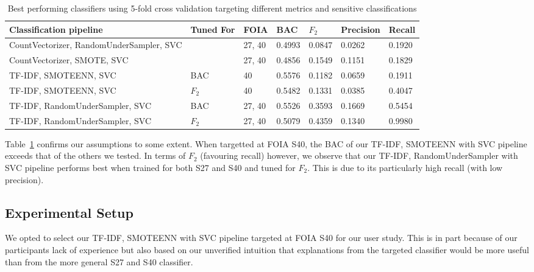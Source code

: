 \documentclass[\version]{l4proj}
\begin{document}
\begin{table}[H]
    \begin{adjustbox}{width=\textwidth,center}
        \begin{tabular}{l|llllll}
            Classification pipeline                  & Tuned For & FOIA   & BAC    & \(F_{2}\) & Precision & Recall \\ \hline
            CountVectorizer, RandomUnderSampler, SVC &           & 27, 40 & 0.4993 & 0.0847    & 0.0262    & 0.1920 \\
            CountVectorizer, SMOTE, SVC              &           & 27, 40 & 0.4856 & 0.1549    & 0.1151    & 0.1829 \\
            TF-IDF, SMOTEENN, SVC                    & BAC       & 40     & 0.5576 & 0.1182    & 0.0659    & 0.1911 \\
            TF-IDF, SMOTEENN, SVC                    & \(F_{2}\) & 40     & 0.5482 & 0.1331    & 0.0385    & 0.4047 \\
            TF-IDF, RandomUnderSampler, SVC          & BAC       & 27, 40 & 0.5526 & 0.3593    & 0.1669    & 0.5454 \\
            TF-IDF, RandomUnderSampler, SVC          & \(F_{2}\) & 27, 40 & 0.5079 & 0.4359    & 0.1340    & 0.9980 \\
        \end{tabular}
    \end{adjustbox}
    \caption{Best performing classifiers using 5-fold cross validation targeting different metrics and sensitive classifications}\label{tab:clf_perf}
\end{table}

Table~\ref{tab:clf_perf} confirms our assumptions to some extent.
When targetted at FOIA S40, the BAC of our TF-IDF, SMOTEENN with SVC pipeline exceeds that of the others we tested.
In terms of \(F_{2}\) (favouring recall) however, we observe that our TF-IDF, RandomUnderSampler with SVC pipeline performs best when trained for both S27 and S40 and tuned for \(F_{2}\).
This is due to its particularly high recall (with low precision).

\subsection{Experimental Setup}

We opted to select our TF-IDF, SMOTEENN with SVC pipeline targeted at FOIA S40 for our user study.
This is in part because of our participants lack of experience but also based on our unverified intuition that explanations from the targeted classifier would be more useful than from the more general S27 and S40 classifier.
\end{document}
